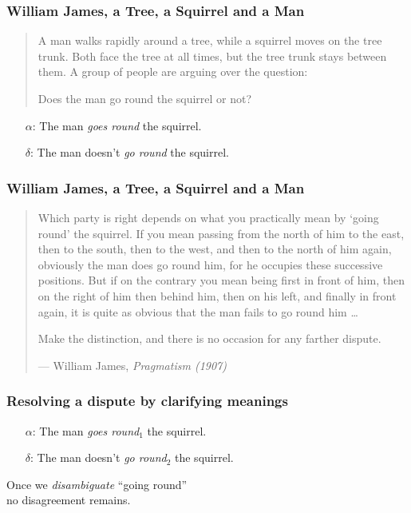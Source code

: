 \documentclass{beamer} %
\begin{document}
\begin{frame}\frametitle{William James, a Tree, a Squirrel and a Man}\large
\begin{quote}
A man walks rapidly around a tree, while a squirrel moves on the tree trunk. Both face the tree at all times, but the tree trunk stays between them. A group of people are arguing over the question: 

\pause\bigskip
Does the man go round the squirrel or not?
\end{quote}
\pause
\begin{itemize}
\item[$\alpha$:] The man \emph{{goes round}} the squirrel.\\[5mm]
\item[$\delta$:] The man doesn't \emph{{go round}} the squirrel.
\end{itemize}

\end{frame}


\begin{frame}\frametitle{William James, a Tree, a Squirrel and a Man}\large
\begin{quote}
Which party is right depends on what you practically mean by `going round' the squirrel. If you mean passing from the north of him to the east, then to the south, then to the west, and then to the north of him again, obviously the man does go round him, for he occupies these successive positions. But if on the contrary you mean being first in front of him, then on the right of him then behind him, then on his left, and finally in front again, it is quite as obvious that the man fails to go round him \ldots

\medskip\noindent
Make the distinction, and there is no occasion for any farther dispute. 

\medskip\noindent\hfill
--- William James, \emph{Pragmatism (1907)}
\end{quote}
\end{frame}

\begin{frame}\frametitle{Resolving a dispute by clarifying meanings}\Large

\begin{itemize}
\item[$\alpha$:] The man \emph{{goes round}}$_1$ the squirrel.\\[5mm]
\item[$\delta$:] The man doesn't \emph{{go round}}$_2$ the squirrel.
\end{itemize}

\medskip\pause

\begin{center}
Once we \emph{disambiguate} ``going round''\\ no disagreement remains.
\end{center}
\end{frame}
\end{document}
